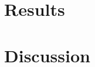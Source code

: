 \documentclass{article}
\begin{document}
%
%
%
%
%


\section{Results}
\label{sec:results}

%
%
%


\section{Discussion}
\label{sec:discussion}
\end{document}
